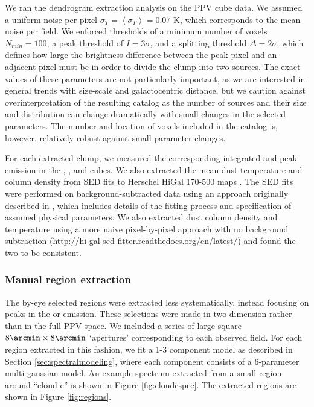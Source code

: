 
We ran the dendrogram extraction analysis on the 
\threeohthree PPV cube data.  We assumed a uniform noise per pixel
$\sigma_{T}=\left<\sigma_T\right>=0.07$ K, which corresponds to the mean noise
per field.  We enforced thresholds of a minimum number of
voxels $N_{min}=100$, a peak threshold of $I = 3\sigma$, and a splitting
threshold $\Delta = 2\sigma$, which defines how large the brightness difference
between
the peak pixel and an adjacent pixel must be in order to divide the clump into two
sources.  The exact values of these parameters are not particularly
important, as we are interested in general trends with size-scale and
galactocentric distance, but we caution against overinterpretation of the
resulting catalog as the number of sources and their size and distribution can
change dramatically with small changes in the selected parameters.  The number
and location of voxels included in the catalog is, however, relatively robust
against small parameter changes.

For each extracted clump, we measured the corresponding integrated and peak
emission in the \threeohthree, \threetwoone, and \thirteenco cubes.  We also extracted the mean
dust temperature and column density from SED fits to Herschel HiGal 170-500\um
maps \citep{Molinari2010a,Traficante2011a}.  The SED fits were performed on
background-subtracted data using an approach originally described in
\citet{Battersby2011a}, which includes details of the fitting process and
specification of assumed physical parameters.  We also extracted dust column
density and temperature using a more naive pixel-by-pixel approach with no
background subtraction
(\url{http://hi-gal-sed-fitter.readthedocs.org/en/latest/}) and found the two
to be consistent.

\subsubsection{Manual region extraction}
\label{sec:byeye}
The by-eye selected regions were extracted less systematically, instead
focusing on peaks in the \threeohthree or \threetwoone emission.  These
selections were made in two dimension rather than in the full PPV space.  We
included a series of large square $8\arcmin \times 8\arcmin$ `apertures'
corresponding to each observed field.  For each region extracted in this
fashion, we fit a 1-3 component model as described in Section
\ref{sec:spectralmodeling}, where each component consists of a 6-parameter
multi-gaussian model.  An example spectrum extracted from a small region around
``cloud c'' is shown in Figure \ref{fig:cloudcspec}.  The extracted regions are
shown in Figure \ref{fig:regions}.

